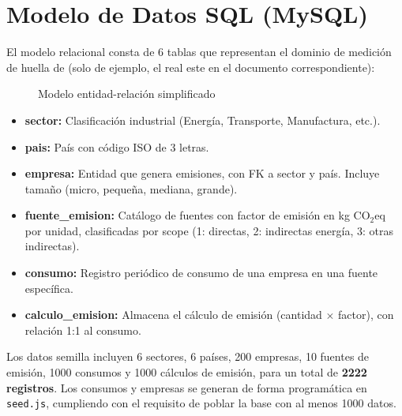 \documentclass[12pt, a4paper]{article}
\begin{document}
\section{Modelo de Datos SQL (MySQL)}
El modelo relacional consta de 6 tablas que representan el dominio de medición de huella de  (solo de ejemplo, el real este en el documento correspondiente):
\begin{figure}[H]
\centering
{}
\caption{Modelo entidad-relación simplificado}
\end{figure}
\begin{itemize}[nosep]
  \item \textbf{sector:} Clasificación industrial (Energía, Transporte, Manufactura, etc.).
  \item \textbf{pais:} País con código ISO de 3 letras.
  \item \textbf{empresa:} Entidad que genera emisiones, con FK a sector y país. Incluye tamaño (micro, pequeña, mediana, grande).
  \item \textbf{fuente\_emision:} Catálogo de fuentes con factor de emisión en kg CO$_2$eq por unidad, clasificadas por scope (1: directas, 2: indirectas energía, 3: otras indirectas).
  \item \textbf{consumo:} Registro periódico de consumo de una empresa en una fuente específica.
  \item \textbf{calculo\_emision:} Almacena el cálculo de emisión (cantidad $\times$ factor), con relación 1:1 al consumo.
\end{itemize}
Los datos semilla incluyen 6 sectores, 6 países, 200 empresas, 10 fuentes de emisión, 1000 consumos y 1000 cálculos de emisión, para un total de \textbf{2222 registros}. Los consumos y empresas se generan de forma programática en \texttt{seed.js}, cumpliendo con el requisito de poblar la base con al menos 1000 datos.
\end{document}
